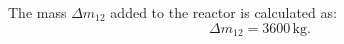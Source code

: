 The mass \( \Delta m_{12} \) added to the reactor is calculated as:  
\[
\Delta m_{12} = 3600 \, \text{kg}.
\]